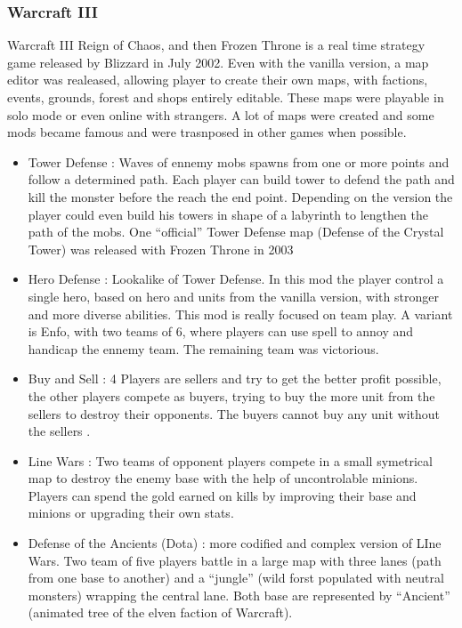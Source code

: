 \documentclass[a4paper,11pt]{article}
\begin{document}
\subsubsection{Warcraft III}

Warcraft III Reign of Chaos, and then Frozen Throne is a real time strategy game released by Blizzard in July 2002. Even with the vanilla version, a map editor was realeased, allowing player to create their own maps, with factions, events, grounds, forest and shops entirely editable. These maps were playable in solo mode or even online with strangers. A lot of maps were created and some mods became famous and were trasnposed in other games when possible.
\begin{itemize}
\item Tower Defense : Waves of ennemy mobs spawns from one or more points and follow a determined path. Each player can build tower to defend the path and kill the monster before the reach the end point. Depending on the version the player could even build his towers in shape of a labyrinth to lengthen the path of the mobs. One “official” Tower Defense map (Defense of the Crystal Tower) was released with Frozen Throne in 2003
\item Hero Defense : Lookalike of Tower Defense. In this mod the player control a single hero, based on hero and units from the vanilla version, with stronger and more diverse abilities. This mod is really focused on team play. A variant is Enfo, with two teams of 6, where players can use spell to annoy and handicap the ennemy team. The remaining team was victorious.
\item Buy and Sell : 4 Players are sellers and try to get the better profit possible, the other players compete as buyers, trying to buy the more unit from the sellers to destroy their opponents. The buyers cannot buy any unit without the sellers . 
\item Line Wars : Two teams of opponent players compete in a small symetrical map to destroy the enemy base with the help of uncontrolable minions. Players can spend the gold earned on kills by improving their base and minions or upgrading their own stats.
\item Defense of the Ancients (Dota) : more codified and complex version of LIne Wars. Two team of five players battle in a large map with three lanes (path from one base to another) and 
a “jungle” (wild forst populated with neutral monsters) wrapping the central lane. Both base are represented by “Ancient” (animated tree of the elven faction of Warcraft).
\end{itemize}
\end{document}
